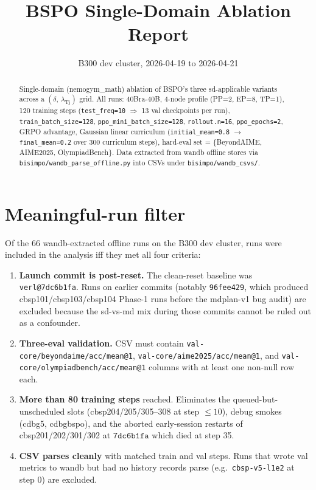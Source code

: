 \documentclass[10pt]{article}
\title{BSPO Single-Domain Ablation Report}
\author{B300 dev cluster, 2026-04-19 to 2026-04-21}
\date{}
\begin{document}
\maketitle

\begin{abstract}
\noindent
Single-domain (nemogym\_math) ablation of BSPO's three sd-applicable
variants across a $(\delta,\, \lambda_{\mathrm{Tj}})$ grid. All runs:
40Bra-40B, 4-node profile (PP=2, EP=8, TP=1), 120 training steps
(\texttt{test\_freq=10} $\Rightarrow$ 13 val checkpoints per run),
\texttt{train\_batch\_size=128}, \texttt{ppo\_mini\_batch\_size=128},
\texttt{rollout.n=16}, \texttt{ppo\_epochs=2}, GRPO advantage, Gaussian
linear curriculum (\texttt{initial\_mean=0.8} $\to$
\texttt{final\_mean=0.2} over 300 curriculum steps), hard-eval set =
\{BeyondAIME, AIME2025, OlympiadBench\}. Data extracted from wandb
offline stores via \texttt{bisimpo/wandb\_parse\_offline.py} into CSVs
under \texttt{bisimpo/wandb\_csvs/}.
\end{abstract}

\section{Meaningful-run filter}

Of the 66 wandb-extracted offline runs on the B300 dev cluster, runs
were included in the analysis iff they met all four criteria:

\begin{enumerate}
\item \textbf{Launch commit is post-reset.} The clean-reset baseline
  was \texttt{verl@7dc6b1fa}. Runs on earlier commits (notably
  \texttt{96fee429}, which produced cbsp101/cbsp103/cbsp104 Phase-1
  runs before the mdplan-v1 bug audit) are excluded because the
  sd-vs-md mix during those commits cannot be ruled out as a
  confounder.
\item \textbf{Three-eval validation.} CSV must contain
  \texttt{val-core/beyondaime/acc/mean@1},
  \texttt{val-core/aime2025/acc/mean@1}, and
  \texttt{val-core/olympiadbench/acc/mean@1} columns with at least
  one non-null row each.
\item \textbf{More than 80 training steps} reached. Eliminates the
  queued-but-unscheduled slots (cbsp204/205/305--308 at step $\leq
  10$), debug smokes (cdbg5, cdbgbspo), and the aborted early-session
  restarts of cbsp201/202/301/302 at $\texttt{7dc6b1fa}$ which died
  at step 35.
\item \textbf{CSV parses cleanly} with matched train and val steps.
  Runs that wrote val metrics to wandb but had no history records
  parse (e.g.\ \texttt{cbsp-v5-l1e2} at step 0) are excluded.
\end{enumerate}
\end{document}
